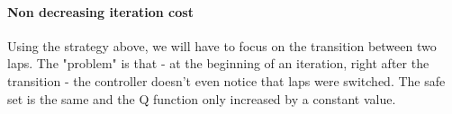 \paragraph{Non decreasing iteration cost} Using the strategy above, we will have to focus on the transition between two laps. The "problem" is that - at the beginning of an iteration, right after the transition - the controller doesn't even notice that laps were switched. The safe set is the same and the Q function only increased by a constant value.
